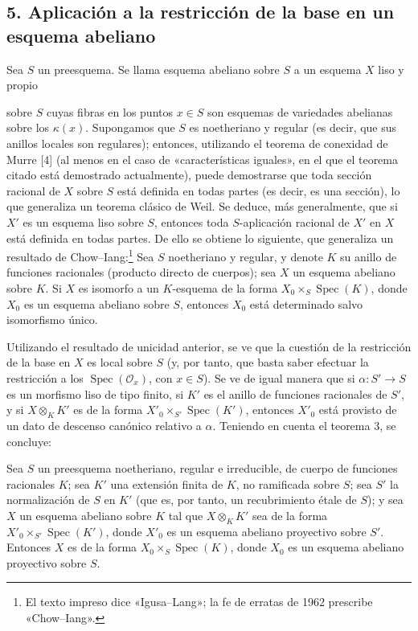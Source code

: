 \subsection*{5. Aplicación a la restricción de la base en un esquema abeliano}

Sea $S$ un preesquema. Se llama esquema abeliano sobre $S$ a un esquema $X$
liso y propio

sobre $S$ cuyas fibras en los puntos $x\in S$ son esquemas de variedades
abelianas sobre los $\kappa(x)$. Supongamos que $S$ es noetheriano y regular
(es decir, que sus anillos locales son regulares); entonces, utilizando el
teorema de conexidad de Murre [4] (al menos en el caso de «características
iguales», en el que el teorema citado está demostrado actualmente), puede
demostrarse que toda sección racional de $X$ sobre $S$ está definida en todas
partes (es decir, es una sección), lo que generaliza un teorema clásico de
Weil. Se deduce, más generalmente, que si $X'$ es un esquema liso sobre $S$,
entonces toda $S$-aplicación racional de $X'$ en $X$ está definida en todas
partes. De ello se obtiene lo siguiente, que generaliza un resultado de
Chow--Iang:\footnote{El texto impreso dice «Igusa--Lang»; la fe de erratas de
1962 prescribe «Chow--Iang».} Sea $S$ noetheriano y regular, y denote $K$ su
anillo de funciones racionales (producto directo de cuerpos); sea $X$ un
esquema abeliano sobre $K$. Si $X$ es isomorfo a un $K$-esquema de la forma
$X_0\times_S\operatorname{Spec}(K)$, donde $X_0$ es un esquema abeliano sobre
$S$, entonces $X_0$ está determinado salvo isomorfismo único.

Utilizando el resultado de unicidad anterior, se ve que la cuestión de la
restricción de la base en $X$ es local sobre $S$ (y, por tanto, que basta saber
efectuar la restricción a los $\operatorname{Spec}(\mathcal O_x)$, con
$x\in S$). Se ve de igual manera que si
$\alpha:S'\longrightarrow S$ es un morfismo liso de tipo finito, si $K'$ es el
anillo de funciones racionales de $S'$, y si $X\otimes_KK'$ es de la forma
$X'_0\times_{S'}\operatorname{Spec}(K')$, entonces $X'_0$ está provisto de un
dato de descenso canónico relativo a $\alpha$. Teniendo en cuenta el teorema 3,
se concluye:

 Sea $S$ un preesquema noetheriano, regular e
irreducible, de cuerpo de funciones racionales $K$; sea $K'$ una extensión
finita de $K$, no ramificada sobre $S$; sea $S'$ la normalización de $S$ en
$K'$ (que es, por tanto, un recubrimiento étale de $S$); y sea $X$ un esquema
abeliano sobre $K$ tal que $X\otimes_KK'$ sea de la forma
$X'_0\times_{S'}\operatorname{Spec}(K')$, donde $X'_0$ es un esquema abeliano
proyectivo sobre $S'$. Entonces $X$ es de la forma
$X_0\times_S\operatorname{Spec}(K)$, donde $X_0$ es un esquema abeliano
proyectivo sobre $S$.

